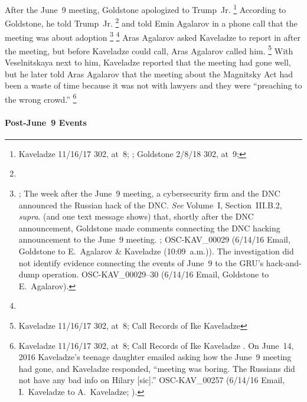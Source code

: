 After the June~9 meeting, Goldstone apologized to Trump~Jr.%
\footnote{Kaveladze 11/16/17 302, at~8; ; Goldstone 2/8/18 302, at~9; }
According to Goldstone, he told Trump~Jr.
\footnote{}
and told Emin Agalarov in a phone call that the meeting was about adoption
\footnote{;
The week after the June~9 meeting, a cybersecurity firm and the DNC announced the Russian hack of the DNC\null.
\textit{See} Volume~I, Section~III.B.2, \textit{supra}.
(and one text message shows) that, shortly after the DNC announcement, Goldstone made comments connecting the DNC hacking announcement to the June~9 meeting.
; OSC-KAV\_00029 (6/14/16 Email, Goldstone to E.~Agalarov \& Kaveladze (10:09~a.m.)).
The investigation did not identify evidence connecting the events of June~9 to the GRU's hack-and-dump operation.
OSC-KAV\_00029--30 (6/14/16 Email, Goldstone to E.~Agalarov).}
\footnote{}
Aras Agalarov asked Kaveladze to report in after the meeting, but before Kaveladze could call, Aras Agalarov called him.%
\footnote{Kaveladze 11/16/17 302, at~8; Call Records of Ike Kaveladze }
With Veselnitskaya next to him, Kaveladze reported that the meeting had gone well, but he later told Aras Agalarov that the meeting about the Magnitsky Act had been a waste of time because it was not with lawyers and they were ``preaching to the wrong crowd.''%
\footnote{Kaveladze 11/16/17 302, at~8; Call Records of Ike Kaveladze .
On June~14, 2016 Kaveladze's teenage daughter emailed asking how the June~9 meeting had gone, and Kaveladze responded, ``meeting was boring.
The Russians did not have any bad info on Hilary [sic].''
OSC-KAV\_00257 (6/14/16 Email, I.~Kaveladze to A.~Kaveladze; ).}

\paragraph{Post-June~9 Events}

